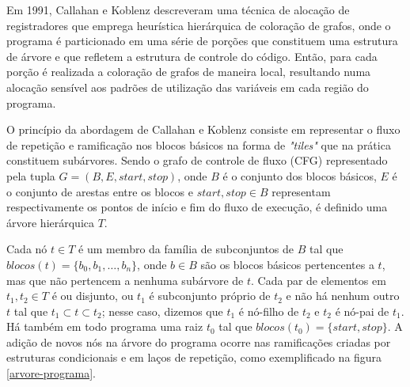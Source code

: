 \documentclass[
	12pt,				%
	openright,			%
	oneside,			%
	a4paper,			%
	tccpreliminar,			%
	]{ABNT-DC-UEL}
\begin{document}
Em 1991, Callahan e Koblenz \cite{callahan:91} descreveram uma técnica de alocação de registradores que emprega heurística hierárquica de coloração de grafos, onde o programa é particionado em uma série de porções que constituem uma estrutura de árvore e que refletem a estrutura de controle do código. Então, para cada porção é realizada a coloração de grafos de maneira local, resultando numa alocação sensível aos padrões de utilização das variáveis em cada região do programa.

O princípio da abordagem de Callahan e Koblenz consiste em representar o fluxo de repetição e ramificação nos blocos básicos na forma de \textit{"tiles"} que na prática constituem subárvores. Sendo o grafo de controle de fluxo (CFG) representado pela tupla $G = (B, E, \textit{start}, \textit{stop})$, onde $B$ é o conjunto dos blocos básicos, $E$ é o conjunto de arestas entre os blocos e $\textit{start}, \textit{stop} \in B$ representam respectivamente os pontos de início e fim do fluxo de execução, é definido uma árvore hierárquica $T$.

Cada nó $t \in T$ é um membro da família de subconjuntos de $B$ tal que $\textit{blocos}(t) = \{b_0, b_1, \dots, b_n\}$, onde $b \in B$ são os blocos básicos pertencentes a $t$, mas que não pertencem a nenhuma subárvore de $t$. Cada par de elementos em $t_1, t_2 \in T$ é ou disjunto, ou $t_1$ é subconjunto próprio de $t_2$ e não há nenhum outro $t$ tal que $t_1 \subset t \subset t_2$; nesse caso, dizemos que $t_1$ é nó-filho de $t_2$ e $t_2$ é nó-pai de $t_1$. Há também em todo programa uma raiz $t_0$ tal que $\textit{blocos}(t_0) = \{\textit{start}, \textit{stop}\}$. A adição de novos nós na árvore do programa ocorre nas ramificações criadas por estruturas condicionais e em laços de repetição, como exemplificado na figura \ref{arvore-programa}.
\end{document}
